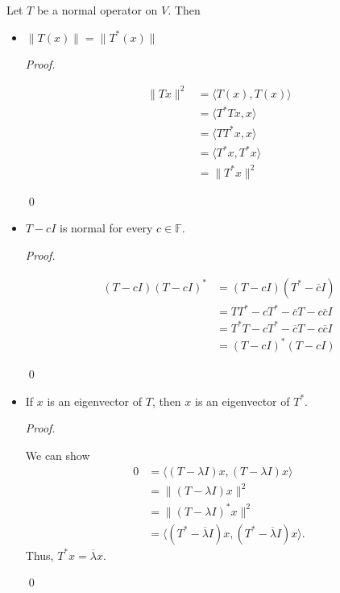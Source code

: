 \documentclass[12pt]{article}
\newenvironment{theorem}[2][Theorem]{\begin{trivlist}
\item[\hskip \labelsep {\bfseries #1}\hskip \labelsep {\bfseries #2.}]}{\end{trivlist}}
\newenvironment{sol}
    {\emph{Proof.}
    }
    {
    \qed
    }
\begin{document}
\begin{theorem}{6.15}
Let $T$ be a normal operator on $V$. Then 

\begin{itemize}
    \item[(a)] $\lVert T(x) \rVert = \lVert T^*(x) \rVert$
    
    \begin{sol}
    \begin{align*}
        \lVert Tx \rVert^2 &= \langle T(x), T(x) \rangle \\
        &= \langle T^*Tx, x \rangle \\
        &= \langle TT^*x, x \rangle \\
        &= \langle T^*x, T^*x \rangle \\
        &= \lVert T^*x \rVert^2
    \end{align*}
    \end{sol}
    
    \item[(b)] $T - cI$ is normal for every $c \in \mathbb{F}$.
    
    \begin{sol}
    \begin{align*}
        (T - cI)(T - cI)^* &= (T - cI)(T^* - \overline{c}I) \\
        &= TT^* - cT^* - \overline{c}T - c \overline{c} I \\
        &= T^*T - cT^* - \overline{c}T - c \overline{c} I \\
        &= (T - cI)^*(T - cI)
    \end{align*}
    \end{sol}
    
    \item[(c)] If $x$ is an eigenvector of $T$, then $x$ is an eigenvector of $T^*$.
    
    \begin{sol}
    We can show \begin{align*}
        0 &= \langle (T - \lambda I)x, (T - \lambda I)x \rangle \\
        &= \lVert (T - \lambda I)x \rVert^2 \\
        &= \lVert (T - \lambda I)^*x \rVert^2 \tag{From (a) and (b)} \\
        &= \langle (T^* - \overline{\lambda} I)x, (T^* - \overline{\lambda} I)x \rangle.
    \end{align*} Thus, $T^*x = \overline{\lambda}x$.
    \end{sol}
    

\end{itemize}
\end{theorem}
\end{document}
